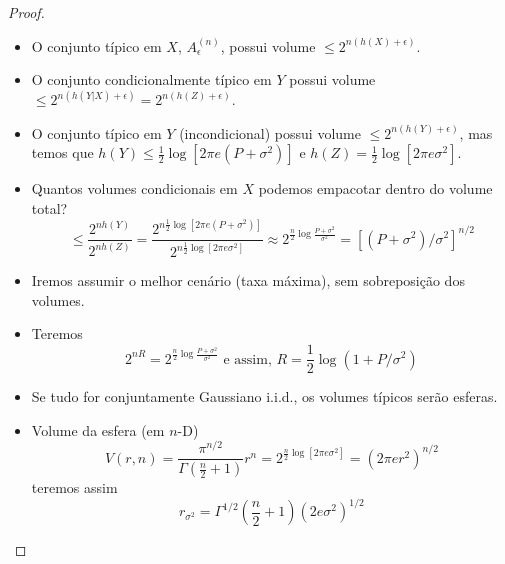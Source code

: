 \begin{frame}[allowframebreaks]
  \begin{proof}
  \begin{itemize}
  \item O conjunto típico em $X$, $A_{\epsilon}^{(n)}$, possui volume $\leq 2^{n(h(X) + \epsilon)}$.
  \item O conjunto condicionalmente típico em $Y$ possui volume $\leq 2^{n(h(Y|X) + \epsilon)} = 2^{n(h(Z) + \epsilon)}$.
  \item O conjunto típico em $Y$ (incondicional) possui volume $\leq 2^{n(h(Y) + \epsilon)}$, mas
	temos que $h(Y) \leq \frac{1}{2} \log [2 \pi e (P + \sigma^2)]$ e $h(Z) = \frac{1}{2} \log [ 2 \pi e \sigma^2 ]$.
  \end{itemize}
  \proofbreak
  \begin{itemize}
  \item Quantos volumes condicionais em $X$ podemos empacotar dentro do volume total?
	\begin{equation}
	\leq \frac{2^{nh(Y)}}{2^{nh(Z)}} = \frac{2^{n \frac{1}{2} \log [2 \pi e (P+\sigma^2)]}}{2^{n\frac{1}{2} \log [2 \pi e \sigma^2]}} \approx 2^{\frac{n}{2} \log \frac{P+\sigma^2}{\sigma^2}} = [(P+\sigma^2)/\sigma^2]^{n/2}
	\end{equation}
  \item Iremos assumir o melhor cenário (taxa máxima), sem sobreposição dos volumes.
  \item Teremos
	\begin{equation}
	2^{nR} = 2^{\frac{n}{2} \log \frac{P + \sigma^2}{\sigma^2}} \text{ e assim, } R = \frac{1}{2} \log (1 + P/\sigma^2)
	\end{equation}
  \end{itemize}
  \proofbreak
  \begin{itemize}
  \item Se tudo for conjuntamente Gaussiano i.i.d., os volumes típicos serão esferas.
  \item Volume da esfera (em $n$-D)
	\begin{equation}
	V(r,n) = \frac{\pi^{n/2}}{\Gamma \left( \frac{n}{2} + 1 \right)} r^n = 2^{\frac{n}{2} \log [2 \pi e \sigma^2]} = (2\pi e r^2)^{n/2}
	\end{equation}
	teremos assim
	\begin{equation}
	r_{\sigma^2} = \Gamma^{1/2} \left( \frac{n}{2} + 1 \right) (2 e \sigma^2)^{1/2}
	\end{equation}
  \end{itemize}

  \proofbreak


\end{proof}
\end{frame}
